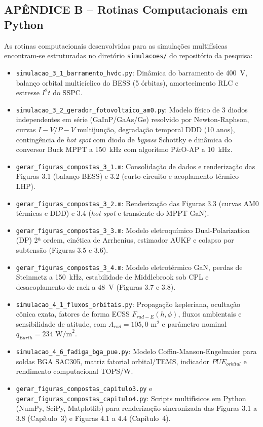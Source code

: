 \vspace{0.8cm}
\subsection*{APÊNDICE B -- Rotinas Computacionais em Python}

As rotinas computacionais desenvolvidas para as simulações multifísicas encontram-se estruturadas no diretório \texttt{simulacoes/} do repositório da pesquisa:
\begin{itemize}[noitemsep,topsep=2pt,leftmargin=*]
    \item \texttt{simulacao\_3\_1\_barramento\_hvdc.py}: Dinâmica do barramento de 400~V, balanço orbital multicíclico do BESS (5 órbitas), amortecimento RLC e estresse $I^2t$ do SSPC.
    \item \texttt{simulacao\_3\_2\_gerador\_fotovoltaico\_am0.py}: Modelo físico de 3 diodos independentes em série (GaInP/GaAs/Ge) resolvido por Newton-Raphson, curvas $I-V/P-V$ multijunção, degradação temporal DDD (10 anos), contingência de \textit{hot spot} com diodo de \textit{bypass} Schottky e dinâmica do conversor Buck MPPT a 150~kHz com algoritmo P\&O-AP a 10~kHz.
    \item \texttt{gerar\_figuras\_compostas\_3\_1.m}: Consolidação de dados e renderização das Figuras 3.1 (balanço BESS) e 3.2 (curto-circuito e acoplamento térmico LHP).
    \item \texttt{gerar\_figuras\_compostas\_3\_2.m}: Renderização das Figuras 3.3 (curvas AM0 térmicas e DDD) e 3.4 (\textit{hot spot} e transiente do MPPT GaN).
    \item \texttt{gerar\_figuras\_compostas\_3\_3.m}: Modelo eletroquímico Dual-Polarization (DP) 2ª ordem, cinética de Arrhenius, estimador AUKF e colapso por subtensão (Figuras 3.5 e 3.6).
    \item \texttt{gerar\_figuras\_compostas\_3\_4.m}: Modelo eletrotérmico GaN, perdas de Steinmetz a 150~kHz, estabilidade de Middlebrook sob CPL e desacoplamento de rack a 48~V (Figuras 3.7 e 3.8).
    \item \texttt{simulacao\_4\_1\_fluxos\_orbitais.py}: Propagação kepleriana, ocultação cônica exata, fatores de forma ECSS $F_{rad-E}(h, \phi)$, fluxos ambientais e sensibilidade de atitude, com $A_{rad}=105{,}0\text{ m}^2$ e parâmetro nominal $q_{Earth}=234\text{ W/m}^2$.
    \item \texttt{simulacao\_4\_6\_fadiga\_bga\_pue.py}: Modelo Coffin-Manson-Engelmaier para soldas BGA SAC305, matriz fatorial orbital/TEMS, indicador $PUE_{orbital}$ e rendimento computacional TOPS/W.
    \item \texttt{gerar\_figuras\_compostas\_capitulo3.py} e\\
    \texttt{gerar\_figuras\_compostas\_capitulo4.py}: Scripts multifísicos em Python (NumPy, SciPy, Matplotlib) para renderização sincronizada das Figuras 3.1 a 3.8 (Capítulo~3) e Figuras 4.1 a 4.4 (Capítulo~4).
\end{itemize}

